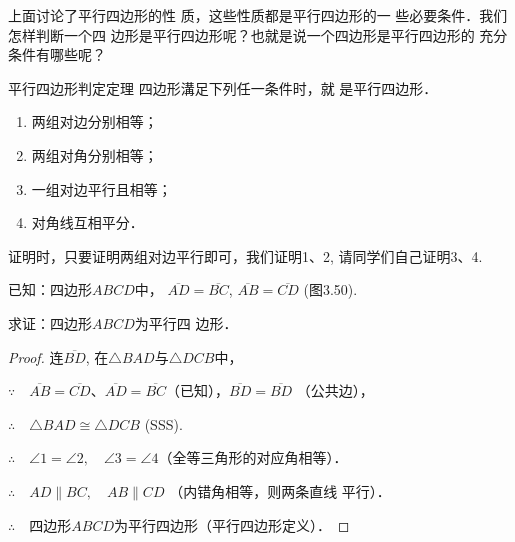 上面讨论了平行四边形的性
质，这些性质都是平行四边形的一
些必要条件．我们怎样判断一个四
边形是平行四边形呢？也就是说一个四边形是平行四边形的
充分条件有哪些呢？

\begin{blk}
    {平行四边形判定定理} 四边形溝足下列任一条件时，就
是平行四边形．
\begin{enumerate}
\item 两组对边分别相等；
\item 两组对角分别相等；
\item 一组对边平行且相等；
\item 对角线互相平分．
\end{enumerate}
\end{blk}

证明时，只要证明两组对边平行即可，我们证明1、2, 请同学们自己证明3、4.

已知：四边形$ABCD$中，
$\overline{AD}=\overline{BC}$, $\overline{AB}=\overline{CD}$ (图3.50).

求证：四边形$ABCD$为平行四
边形．

\begin{proof}
    连$\overline{BD}$, 在$\triangle BAD$与$\triangle DCB$中，

$\because\quad     \overline{AB}=\overline{CD}$、$\overline{AD}=\overline{BC}$（已知），$\overline{BD}=\overline{BD}$ （公共边），

$\therefore\quad \triangle BAD\cong \triangle DCB$ (SSS).

$\therefore\quad \angle 1=\angle 2,\quad \angle 3=\angle 4$（全等三角形的对应角相等）．

$\therefore\quad AD\parallel BC,\quad AB\parallel CD$ （内错角相等，则两条直线
平行）．

$\therefore\quad $四边形$ABCD$为平行四边形（平行四边形定义）．
\end{proof}

\begin{figure}[htp]\centering
    \begin{minipage}[t]{0.48\textwidth}
    \centering
{}
    \caption{}
    \end{minipage}
    \begin{minipage}[t]{0.48\textwidth}
    \centering
    \caption{}
    \end{minipage}
    \end{figure}

